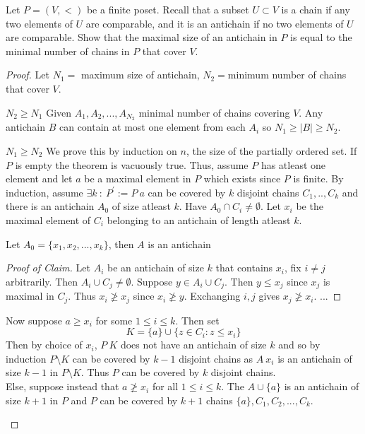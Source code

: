 \documentclass[a4paper]{article}
\begin{document}
\begin{question}[Question 1]
	Let $P = (V, <)$ be a finite poset. Recall that a subset $U \subset V$ is a chain if any two elements of $U$ are comparable, and it is an antichain if no two elements of $U$ are comparable. Show that the maximal size of an antichain in $P$ is equal to the minimal number of chains in $P$ that cover $V$.
\end{question}
\begin{proof}
	Let $N_1 = $ maximum size of antichain, $N_2 = $minimum number of chains that cover $V$.
	\begin{description}
	\item \underline{$N_2 \geq N_1$} Given $A_1, A_2, ..., A_{N_2}$ minimal number of chains covering $V$. Any antichain $B$ can contain at most one element from each $A_i$ so $N_1 \geq |B| \geq N_2$.
	\item \underline{$N_1 \geq N_2$} We prove this by induction on $n$, the size of the partially ordered set. If $P$ is empty the theorem is vacuously true. Thus, assume $P$ has atleast one element and let $a$ be a maximal element in $P$ which exists since $P$ is finite. By induction, assume $\exists k \ : \ P^{'} := P \ {a}$ can be covered by $k$ disjoint chains $C_1,..,C_k$ and there is an antichain $A_0$ of size atleast $k$. Have $A_0 \cap C_i \not = \emptyset$. Let $x_i$ be the maximal element of $C_i$ belonging to an antichain of length atleast $k$.\\
    \begin{remark}[Claim] Let $A_0 = \{x_1,x_2,...,x_k\}$, then $A$ is an antichain
      \begin{proof}[Proof of Claim]\renewcommand{\qedsymbol}{}
        Let $A_i$ be an antichain of size $k$ that contains $x_i$, fix $i \not = j$
        arbitrarily. Then $A_i \cup C_j \not = \emptyset$. Suppose $y \in A_i \cup
        C_j$. Then $y \leq x_j$ since $x_j$ is maximal in $C_j$. Thus $x_i \not \geq
        x_j$ since $x_i \not \geq y$. Exchanging $i,j$ gives $x_j \not \geq x_i$. ...
      \end{proof}
    \end{remark}
    Now suppose $a \geq x_i$ for some $1 \leq i \leq k$. Then set
    \[K = \{a\} \cup \{z \in C_i : z \leq x_i\}\]
    Then by choice of $x_i$, $P \ K$ does not have an antichain of size $k$ and so by induction $P \setminus K$ can be covered by $k-1$ disjoint chains as $A \ {x_i}$ is an antichain of size $k-1$ in $P \setminus K$. Thus $P$ can be covered by $k$ disjoint chains.\\
    Else, suppose instead that $a \not \geq x_i$ for all $1 \leq i \leq k$. The $A \cup \{a\}$ is an antichain of size $k+1$ in $P$ and $P$ can be covered by $k+1$ chains $\{a\}, C_1, C_2,...,C_k$.
	\end{description}
\end{proof}
\end{document}
